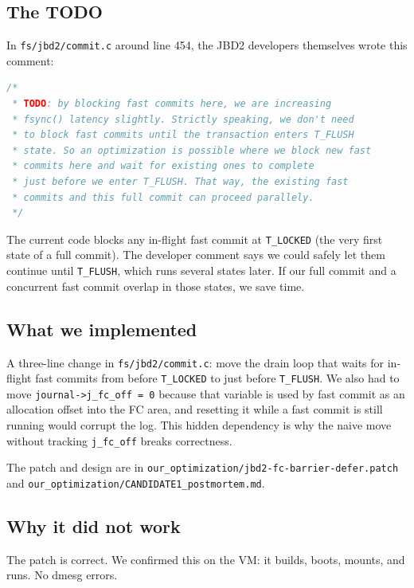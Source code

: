 \documentclass[11pt,a4paper]{article}
\begin{document}
\subsection{The TODO}

In \texttt{fs/jbd2/commit.c} around line 454, the JBD2 developers
themselves wrote this comment:

\begin{lstlisting}[language=C]
/*
 * TODO: by blocking fast commits here, we are increasing
 * fsync() latency slightly. Strictly speaking, we don't need
 * to block fast commits until the transaction enters T_FLUSH
 * state. So an optimization is possible where we block new fast
 * commits here and wait for existing ones to complete
 * just before we enter T_FLUSH. That way, the existing fast
 * commits and this full commit can proceed parallely.
 */
\end{lstlisting}

The current code blocks any in-flight fast commit at
\texttt{T\_LOCKED} (the very first state of a full commit). The
developer comment says we could safely let them continue until
\texttt{T\_FLUSH}, which runs several states later. If our full
commit and a concurrent fast commit overlap in those states, we
save time.

\subsection{What we implemented}

A three-line change in \texttt{fs/jbd2/commit.c}: move the drain
loop that waits for in-flight fast commits from before
\texttt{T\_LOCKED} to just before \texttt{T\_FLUSH}. We also had to
move \texttt{journal->j\_fc\_off = 0} because that variable is used
by fast commit as an allocation offset into the FC area, and
resetting it while a fast commit is still running would corrupt the
log. This hidden dependency is why the naive move without tracking
\texttt{j\_fc\_off} breaks correctness.

The patch and design are in
\texttt{our\_optimization/jbd2-fc-barrier-defer.patch} and
\texttt{our\_optimization/CANDIDATE1\_postmortem.md}.

\subsection{Why it did not work}

The patch is correct. We confirmed this on the VM: it builds, boots,
mounts, and runs. No dmesg errors.
\end{document}
